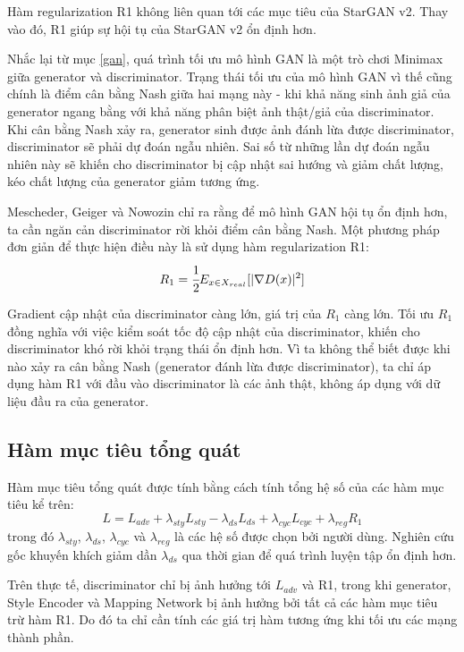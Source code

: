 \documentclass[12pt]{extreport}
\begin{document}
Hàm regularization R1 không liên quan tới các mục tiêu của StarGAN v2. Thay vào đó, R1 giúp sự hội tụ của StarGAN v2 ổn định hơn.

Nhắc lại từ mục \ref{gan}, quá trình tối ưu mô hình GAN là một trò chơi Minimax giữa generator và discriminator. Trạng thái tối ưu của mô hình GAN vì thế cũng chính là điểm cân bằng Nash giữa hai mạng này - khi khả năng sinh ảnh giả của generator ngang bằng với khả năng phân biệt ảnh thật/giả của discriminator. Khi cân bằng Nash xảy ra, generator sinh được ảnh đánh lừa được discriminator, discriminator sẽ phải dự đoán ngẫu nhiên. Sai số từ những lần dự đoán ngẫu nhiên này sẽ khiến cho discriminator bị cập nhật sai hướng và giảm chất lượng, kéo chất lượng của generator giảm tương ứng.

Mescheder, Geiger và Nowozin \cite{DBLP:journals/corr/abs-1801-04406} chỉ ra rằng để mô hình GAN hội tụ ổn định hơn, ta cần ngăn cản discriminator rời khỏi điểm cân bằng Nash. Một phương pháp đơn giản để thực hiện điều này là sử dụng hàm regularization R1:
$$ R_1 = \cfrac{1}{2} E_{x \in X_{real}}[|\nabla D(x)|^2] $$

Gradient cập nhật của discriminator càng lớn, giá trị của $ R_1 $ càng lớn. Tối ưu $ R_1 $ đồng nghĩa với việc kiểm soát tốc độ cập nhật của discriminator, khiến cho discriminator khó rời khỏi trạng thái ổn định hơn.  Vì ta không thể biết được khi nào xảy ra cân bằng Nash (generator đánh lừa được discriminator), ta chỉ áp dụng hàm R1 với đầu vào discriminator là các ảnh thật, không áp dụng với dữ liệu đầu ra của generator.

\subsection{Hàm mục tiêu tổng quát}

Hàm mục tiêu tổng quát được tính bằng cách tính tổng hệ số của các hàm mục tiêu kể trên:
$$ L = L_{adv} + \lambda_{sty} L_{sty} - \lambda_{ds} L_{ds} + \lambda_{cyc} L_{cyc} + \lambda_{reg} R_1  $$
trong đó $ \lambda_{sty} $, $ \lambda_{ds} $, $ \lambda_{cyc} $ và $ \lambda_{reg} $ là các hệ số được chọn bởi người dùng. Nghiên cứu gốc khuyến khích giảm dần $ \lambda_{ds} $ qua thời gian để quá trình luyện tập ổn định hơn.

Trên thực tế, discriminator chỉ bị ảnh hưởng tới $ L_{adv} $ và R1, trong khi generator, Style Encoder và Mapping Network bị ảnh hưởng bởi tất cả các hàm mục tiêu trừ hàm R1. Do đó ta chỉ cần tính các giá trị hàm tương ứng khi tối ưu các mạng thành phần.
\end{document}
